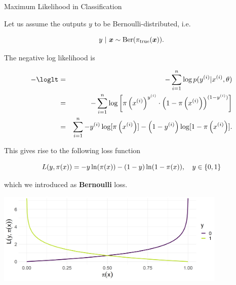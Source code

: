\begin{vbframe}{Maximum Likelihood in Classification}

Let us assume the outputs $y$ to be Bernoulli-distributed, i.e.  

$$
  y ~|~ \bm{x} \sim \text{Ber}(\pi_\text{true}(\bm{x})). 
$$

The negative log likelihood is

\begin{eqnarray*}
- \loglt &=& -\sumin \lpdfyigxit \\ 
&=& - \sumin \log \left[\pi\left(\xi\right)^{y^{(i)}} \cdot \left(1 - \pi\left(\xi\right)\right)^{(1 - y^{(i)})} \right]\\
&=& \sumin -\yi \log[\pi\left(\xi\right)] - \left(1-\yi\right) \log [1 - \pi\left(\xi\right)]. 
\end{eqnarray*}


\framebreak 

This gives rise to the following loss function 

$$
  L(y, \pi(x)) = -y\ln(\pi(x))-(1-y)\ln(1-\pi(x)), \quad y \in \{0, 1\}
$$

which we introduced as \textbf{Bernoulli} loss. 

\vspace{0.2cm}

\begin{center}
\includegraphics[width = 11cm ]{figure/plot_bernoulli_prob.png} \\
\end{center}








\end{vbframe}
